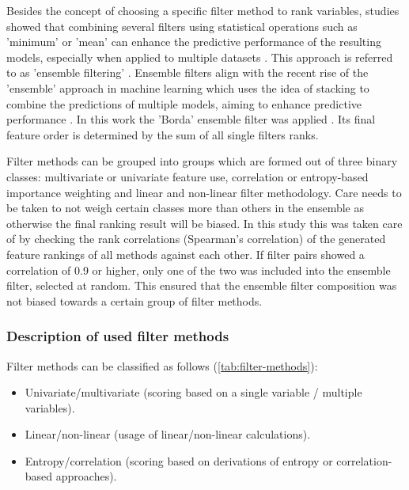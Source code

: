 \documentclass[letterpaper, peerreview, draftcls]{IEEEtran}
\begin{document}
Besides the concept of choosing a specific filter method to rank variables, studies showed that combining several filters using statistical operations such as 'minimum' or 'mean' can enhance the predictive performance of the resulting models, especially when applied to multiple datasets \cite{abeel2010, drotar2017a}.
This approach is referred to as 'ensemble filtering' \cite{dietterich2000}.
Ensemble filters align with the recent rise of the 'ensemble' approach in machine learning which uses the idea of stacking to combine the predictions of multiple models, aiming to enhance predictive performance \cite{polikar2012, feurer2015, bolon-canedo2019}.
In this work the 'Borda' ensemble filter was applied \cite{drotar2017a}.
Its final feature order is determined by the sum of all single filters ranks.

Filter methods can be grouped into groups which are formed out of three binary classes: multivariate or univariate feature use, correlation or entropy-based importance weighting and linear and non-linear filter methodology.
Care needs to be taken to not weigh certain classes more than others in the ensemble as otherwise the final ranking result will be biased.
In this study this was taken care of by checking the rank correlations (Spearman's correlation) of the generated feature rankings of all methods against each other.
If filter pairs showed a correlation of 0.9 or higher, only one of the two was included into the ensemble filter, selected at random.
This ensured that the ensemble filter composition was not biased towards a certain group of filter methods.

\subsubsection{Description of used filter methods}

Filter methods can be classified as follows (\autoref{tab:filter-methods}):

\begin{itemize}
	\item Univariate/multivariate (scoring based on a single variable / multiple variables).
	\item Linear/non-linear (usage of linear/non-linear calculations).
	\item Entropy/correlation (scoring based on derivations of entropy or correlation-based approaches).
\end{itemize}
\end{document}
